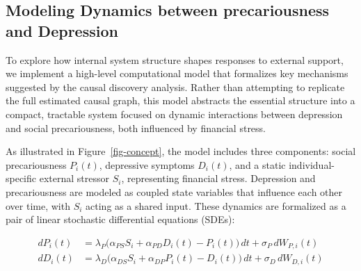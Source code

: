 \documentclass[
]{article}
\begin{document}
\subsection{Modeling Dynamics between precariousness and
Depression}\label{modeling-dynamics-between-precariousness-and-depression}

To explore how internal system structure shapes responses to external
support, we implement a high-level computational model that formalizes
key mechanisms suggested by the causal discovery analysis. Rather than
attempting to replicate the full estimated causal graph, this model
abstracts the essential structure into a compact, tractable system
focused on dynamic interactions between depression and social
precariousness, both influenced by financial stress.

As illustrated in Figure~\ref{fig-concept}, the model includes three
components: social precariousness \(P_i(t)\), depressive symptoms
\(D_i(t)\), and a static individual-specific external stressor \(S_i\),
representing financial stress. Depression and precariousness are modeled
as coupled state variables that influence each other over time, with
\(S_i\) acting as a shared input. These dynamics are formalized as a
pair of linear stochastic differential equations (SDEs):

\[
\begin{aligned}
dP_i(t) &= \lambda_P \big( \alpha_{PS} S_i + \alpha_{PD} D_i(t) - P_i(t) \big) \, dt + \sigma_P \, dW_{P,i}(t) \\
dD_i(t) &= \lambda_D \big( \alpha_{DS} S_i + \alpha_{DP} P_i(t) - D_i(t) \big) \, dt + \sigma_D \, dW_{D,i}(t)
\end{aligned}
\]
\end{document}
